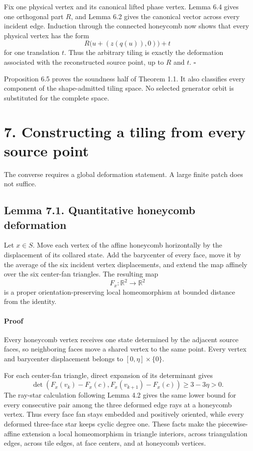 \documentclass[11pt]{article}
\begin{document}
Fix one physical vertex and its canonical lifted phase vertex. Lemma 6.4
gives one orthogonal part \(R\), and Lemma 6.2 gives the canonical vector
across every incident edge. Induction through the connected honeycomb now
shows that every physical vertex has the form
\[
  R\bigl(u+(z(q(u)),0)\bigr)+t
\]
for one translation \(t\). Thus the arbitrary tiling is exactly the
deformation associated with the reconstructed source point, up to \(R\) and
\(t\).
\(\square\)

Proposition 6.5 proves the soundness half of Theorem 1.1. It also classifies
every component of the shape-admitted tiling space. No selected generator
orbit is substituted for the complete space.

\section*{7. Constructing a tiling from every source point}

The converse requires a global deformation statement. A large finite patch
does not suffice.

\subsection*{Lemma 7.1. Quantitative honeycomb deformation}

Let \(x\in S\). Move each vertex of the affine honeycomb horizontally by the
displacement of its collared state. Add the barycenter of every face, move it
by the average of the six incident vertex displacements, and extend the map
affinely over the six center-fan triangles. The resulting map
\[
  F_x:\mathbb R^2\longrightarrow\mathbb R^2
\]
is a proper orientation-preserving local homeomorphism at bounded distance
from the identity.

\paragraph{Proof}

Every honeycomb vertex receives one state determined by the adjacent source
faces, so neighboring faces move a shared vertex to the same point. Every
vertex and barycenter displacement belongs to
\([0,\eta]\times\{0\}\).

For each center-fan triangle, direct expansion of its determinant gives
\[
  \det(F_x(v_k)-F_x(c),F_x(v_{k+1})-F_x(c))
  \geq 3-3\eta>0.
\]
The ray-star calculation following Lemma 4.2 gives the same lower bound for
every consecutive pair among the three deformed edge rays at a honeycomb
vertex. Thus every face fan stays embedded and positively oriented, while
every deformed three-face star keeps cyclic degree one. These facts make the
piecewise-affine extension a local homeomorphism in triangle interiors,
across triangulation edges, across tile edges, at face centers, and at
honeycomb vertices.
\end{document}
